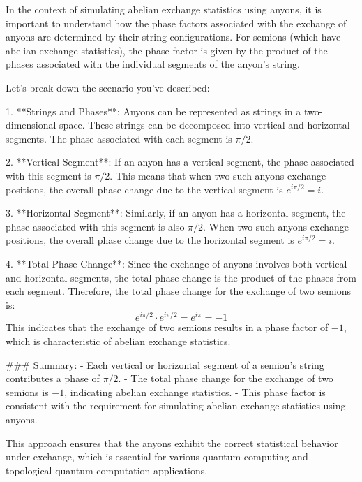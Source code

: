 In the context of simulating abelian exchange statistics using anyons, it is important to understand how the phase factors associated with the exchange of anyons are determined by their string configurations. For semions (which have abelian exchange statistics), the phase factor is given by the product of the phases associated with the individual segments of the anyon's string.

Let's break down the scenario you've described:

1. **Strings and Phases**: Anyons can be represented as strings in a two-dimensional space. These strings can be decomposed into vertical and horizontal segments. The phase associated with each segment is \(\pi/2\).

2. **Vertical Segment**: If an anyon has a vertical segment, the phase associated with this segment is \(\pi/2\). This means that when two such anyons exchange positions, the overall phase change due to the vertical segment is \(e^{i\pi/2} = i\).

3. **Horizontal Segment**: Similarly, if an anyon has a horizontal segment, the phase associated with this segment is also \(\pi/2\). When two such anyons exchange positions, the overall phase change due to the horizontal segment is \(e^{i\pi/2} = i\).

4. **Total Phase Change**: Since the exchange of anyons involves both vertical and horizontal segments, the total phase change is the product of the phases from each segment. Therefore, the total phase change for the exchange of two semions is:
   \[
   e^{i\pi/2} \cdot e^{i\pi/2} = e^{i\pi} = -1
   \]
   This indicates that the exchange of two semions results in a phase factor of \(-1\), which is characteristic of abelian exchange statistics.

### Summary:
- Each vertical or horizontal segment of a semion's string contributes a phase of \(\pi/2\).
- The total phase change for the exchange of two semions is \(-1\), indicating abelian exchange statistics.
- This phase factor is consistent with the requirement for simulating abelian exchange statistics using anyons.

This approach ensures that the anyons exhibit the correct statistical behavior under exchange, which is essential for various quantum computing and topological quantum computation applications.